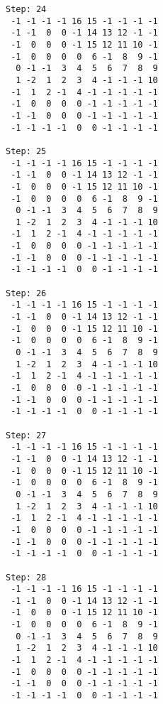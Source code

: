 \begin{verbatim}
Step: 24
 -1 -1 -1 -1 16 15 -1 -1 -1 -1
 -1 -1  0  0 -1 14 13 12 -1 -1
 -1  0  0  0 -1 15 12 11 10 -1
 -1  0  0  0  0  6 -1  8  9 -1
  0 -1 -1  3  4  5  6  7  8  9
  1 -2  1  2  3  4 -1 -1 -1 10
 -1  1  2 -1  4 -1 -1 -1 -1 -1
 -1  0  0  0  0 -1 -1 -1 -1 -1
 -1 -1  0  0  0 -1 -1 -1 -1 -1
 -1 -1 -1 -1  0  0 -1 -1 -1 -1

Step: 25
 -1 -1 -1 -1 16 15 -1 -1 -1 -1
 -1 -1  0  0 -1 14 13 12 -1 -1
 -1  0  0  0 -1 15 12 11 10 -1
 -1  0  0  0  0  6 -1  8  9 -1
  0 -1 -1  3  4  5  6  7  8  9
  1 -2  1  2  3  4 -1 -1 -1 10
 -1  1  2 -1  4 -1 -1 -1 -1 -1
 -1  0  0  0  0 -1 -1 -1 -1 -1
 -1 -1  0  0  0 -1 -1 -1 -1 -1
 -1 -1 -1 -1  0  0 -1 -1 -1 -1

Step: 26
 -1 -1 -1 -1 16 15 -1 -1 -1 -1
 -1 -1  0  0 -1 14 13 12 -1 -1
 -1  0  0  0 -1 15 12 11 10 -1
 -1  0  0  0  0  6 -1  8  9 -1
  0 -1 -1  3  4  5  6  7  8  9
  1 -2  1  2  3  4 -1 -1 -1 10
 -1  1  2 -1  4 -1 -1 -1 -1 -1
 -1  0  0  0  0 -1 -1 -1 -1 -1
 -1 -1  0  0  0 -1 -1 -1 -1 -1
 -1 -1 -1 -1  0  0 -1 -1 -1 -1

Step: 27
 -1 -1 -1 -1 16 15 -1 -1 -1 -1
 -1 -1  0  0 -1 14 13 12 -1 -1
 -1  0  0  0 -1 15 12 11 10 -1
 -1  0  0  0  0  6 -1  8  9 -1
  0 -1 -1  3  4  5  6  7  8  9
  1 -2  1  2  3  4 -1 -1 -1 10
 -1  1  2 -1  4 -1 -1 -1 -1 -1
 -1  0  0  0  0 -1 -1 -1 -1 -1
 -1 -1  0  0  0 -1 -1 -1 -1 -1
 -1 -1 -1 -1  0  0 -1 -1 -1 -1

Step: 28
 -1 -1 -1 -1 16 15 -1 -1 -1 -1
 -1 -1  0  0 -1 14 13 12 -1 -1
 -1  0  0  0 -1 15 12 11 10 -1
 -1  0  0  0  0  6 -1  8  9 -1
  0 -1 -1  3  4  5  6  7  8  9
  1 -2  1  2  3  4 -1 -1 -1 10
 -1  1  2 -1  4 -1 -1 -1 -1 -1
 -1  0  0  0  0 -1 -1 -1 -1 -1
 -1 -1  0  0  0 -1 -1 -1 -1 -1
 -1 -1 -1 -1  0  0 -1 -1 -1 -1
\end{verbatim}

